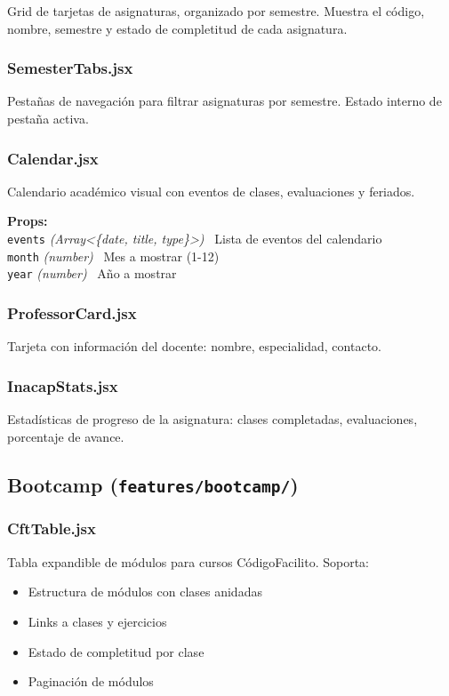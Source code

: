 \documentclass[12pt,a4paper]{article}
\newcommand{\prop}[3]{%
  \texttt{#1} \textit{(#2)} \textemdash\ #3\\%
}
\begin{document}
Grid de tarjetas de asignaturas, organizado por semestre. Muestra el código, nombre, semestre y estado de completitud de cada asignatura.

\subsubsection{SemesterTabs.jsx}

Pestañas de navegación para filtrar asignaturas por semestre. Estado interno de pestaña activa.

\subsubsection{Calendar.jsx}

Calendario académico visual con eventos de clases, evaluaciones y feriados.

\begin{mdframed}[style=propbox]
\textbf{Props:}\\
\prop{events}{Array\textless\{date, title, type\}\textgreater}{Lista de eventos del calendario}
\prop{month}{number}{Mes a mostrar (1-12)}
\prop{year}{number}{Año a mostrar}
\end{mdframed}

\subsubsection{ProfessorCard.jsx}

Tarjeta con información del docente: nombre, especialidad, contacto.

\subsubsection{InacapStats.jsx}

Estadísticas de progreso de la asignatura: clases completadas, evaluaciones, porcentaje de avance.

\subsection{Bootcamp (\texttt{features/bootcamp/})}

\subsubsection{CftTable.jsx}

Tabla expandible de módulos para cursos CódigoFacilito. Soporta:
\begin{itemize}
  \item Estructura de módulos con clases anidadas
  \item Links a clases y ejercicios
  \item Estado de completitud por clase
  \item Paginación de módulos
\end{itemize}
\end{document}
